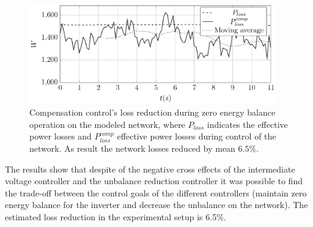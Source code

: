             \begin{figure}[ht]
            \centering
            \includegraphics[width=0.95\textwidth]{Unblance_EPS_Pics/UnbalRedComp_JCP-figure6.eps}
            \caption{Compensation control's loss reduction during zero energy balance operation on the modeled network, where $P_{loss}$ indicates the effective power losses and $P^{comp}_{loss}$ effective power losses during control of the network. As result the network losses reduced by mean $6.5\%$.}
            \label{fig:compare_power}
            \end{figure}

            The results show that despite of the negative cross effects of the intermediate voltage controller and the unbalance reduction controller it was possible to find the trade-off between the control goals of the different controllers (maintain zero energy balance for the inverter and decrease the unbalance on the network). The estimated loss reduction in the experimental setup is 6.5\%.

